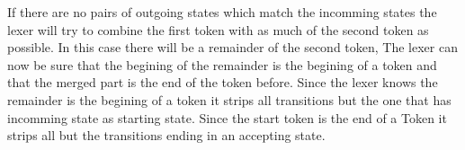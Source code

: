 If there are no pairs of outgoing states which match the incomming states the
lexer will try to combine the first token with as much of the second token as
possible. In this case there will be a remainder of the second token, The lexer
can now be sure that the begining of the remainder is the begining of a token
and that the merged part is the end of the token before.
Since the lexer knows the remainder is the begining of a token it strips all
transitions but the one that has incomming state as starting state. Since the
start token is the end of a Token it strips all but the transitions ending in an
accepting state.
